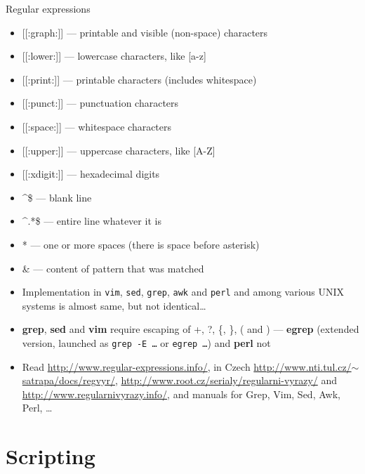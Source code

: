\documentclass[hyperref={bookmarks=true, unicode=true, colorlinks=true, pdftitle={Linux, command line and MetaCentrum}, plainpages=false, pdfauthor={Vojtech Zeisek}, pdfsubject={Course about use of Linux command line, writing shell scripts and using MetaCentrum of CESNET}, pdfcreator={XeLaTeX, http://www.xelatex.org/}, pdfkeywords={Linux, GNU, BASH, shell, command line, MetaCentrum}, linkcolor=Sienna, anchorcolor=black, citecolor=green, filecolor=magenta, menucolor=Sienna, urlcolor=cyan, pdftex}, compress, ucs, xelatex, xcolor=svgnames, 11pt]{beamer}
\begin{document}
\begin{frame}[allowframebreaks]{Regular expressions}
\begin{itemize}
  \item \alert{[[:graph:]]} --- printable and visible (non-space) characters
  \item \alert{[[:lower:]]} --- lowercase characters, like \alert{[a-z]}
  \item \alert{[[:print:]]} --- printable characters (includes whitespace)
  \item \alert{[[:punct:]]} --- punctuation characters
  \item \alert{[[:space:]]} --- whitespace characters
  \item \alert{[[:upper:]]} --- uppercase characters, like \alert{[A-Z]}
  \item \alert{[[:xdigit:]]} --- hexadecimal digits
  \item \alert{\textasciicircum\$} --- blank line
  \item \alert{\textasciicircum.*\$} --- entire line whatever it is
  \item \alert{ *} --- one or more spaces (there is space before asterisk)
  \item \alert{\&} --- content of pattern that was matched
  \item Implementation in \texttt{vim}, \texttt{sed}, \texttt{grep}, \texttt{awk} and \texttt{perl} and among various UNIX systems is almost same, but not identical\ldots
  \item \textbf{grep}, \textbf{sed} and \textbf{vim} require escaping of \alert{+}, \alert{?}, \alert{\{}, \alert{\}}, \alert{(} and \alert{)} --- \textbf{egrep} (extended version, launched as \texttt{grep -E \ldots} or \texttt{egrep \ldots}) and \textbf{perl} not
  \item Read \href{http://www.regular-expressions.info/}{http://www.regular-expressions.info/}, in Czech \href{http://www.nti.tul.cz/~satrapa/docs/regvyr/}{http://www.nti.tul.cz/$\sim$satrapa/docs/regvyr/}, \href{http://www.root.cz/serialy/regularni-vyrazy/}{http://www.root.cz/serialy/regularni-vyrazy/} and \href{http://www.regularnivyrazy.info/}{http://www.regularnivyrazy.info/}, and manuals for Grep, Vim, Sed, Awk, Perl, \ldots
\end{itemize}
\end{frame}

\section{Scripting}
\end{document}
